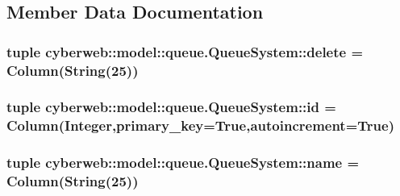 \subsection{\-Member \-Data \-Documentation}
\hypertarget{classcyberweb_1_1model_1_1queue_1_1_queue_system_a8e4afc9acb151ecfc98a40899c8e64db}{
\subsubsection[{delete}]{\setlength{\rightskip}{0pt plus 5cm}tuple {\bf cyberweb\-::model\-::queue.\-Queue\-System\-::delete} = \-Column(\-String(25))}}\label{classcyberweb_1_1model_1_1queue_1_1_queue_system_a8e4afc9acb151ecfc98a40899c8e64db}
\hypertarget{classcyberweb_1_1model_1_1queue_1_1_queue_system_adae76655e755e023898883754c0ccbe1}{
\subsubsection[{id}]{\setlength{\rightskip}{0pt plus 5cm}tuple {\bf cyberweb\-::model\-::queue.\-Queue\-System\-::id} = \-Column(\-Integer,primary\-\_\-key=\-True,autoincrement=\-True)}}\label{classcyberweb_1_1model_1_1queue_1_1_queue_system_adae76655e755e023898883754c0ccbe1}
\hypertarget{classcyberweb_1_1model_1_1queue_1_1_queue_system_aa9816b5d0dbcb8f7df2873e3e3c66636}{
\subsubsection[{name}]{\setlength{\rightskip}{0pt plus 5cm}tuple {\bf cyberweb\-::model\-::queue.\-Queue\-System\-::name} = \-Column(\-String(25))}}\label{classcyberweb_1_1model_1_1queue_1_1_queue_system_aa9816b5d0dbcb8f7df2873e3e3c66636}

